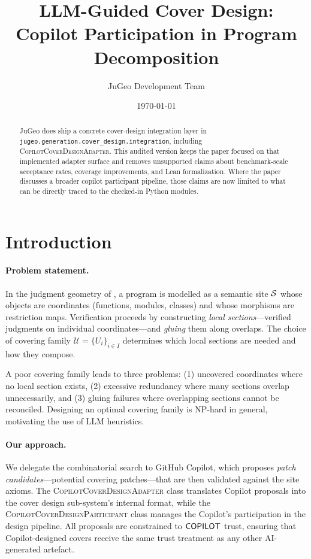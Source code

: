 \documentclass[11pt]{article}
\title{LLM-Guided Cover Design:\\
Copilot Participation in Program Decomposition}
\author{JuGeo Development Team}
\date{\today}
\newcommand{\CovAdapt}{\textsc{CopilotCoverDesignAdapter}}
\newcommand{\CovPart}{\textsc{CopilotCoverDesignParticipant}}
\newcommand{\covfam}{\mathcal{U}}
\begin{document}
\maketitle

\begin{abstract}
JuGeo does ship a concrete cover-design integration layer in
\texttt{jugeo.generation.cover\_design.integration}, including
\CovAdapt{}.  This audited version keeps the paper focused on that
implemented adapter surface and removes unsupported claims about
benchmark-scale acceptance rates, coverage improvements, and Lean
formalization.  Where the paper discusses a broader copilot participant
pipeline, those claims are now limited to what can be directly traced to
the checked-in Python modules.
\end{abstract}

\section{Introduction}\label{sec:intro}

\paragraph{Problem statement.}
In the judgment geometry of \JuGeo{}, a program is modelled as a semantic
site $\mathcal{S}$ whose objects are coordinates (functions, modules, classes) and
whose morphisms are restriction maps.  Verification proceeds by constructing
\emph{local sections}---verified judgments on individual coordinates---and
\emph{gluing} them along overlaps.  The choice of covering family
$\covfam = \{U_i\}_{i \in I}$ determines which local sections are needed
and how they compose.

A poor covering family leads to three problems: (1) uncovered coordinates
where no local section exists, (2) excessive redundancy where many sections
overlap unnecessarily, and (3) gluing failures where overlapping sections
cannot be reconciled.  Designing an optimal covering family is NP-hard in
general, motivating the use of LLM heuristics.

\paragraph{Our approach.}
We delegate the combinatorial search to GitHub Copilot, which proposes
\emph{patch candidates}---potential covering patches---that are then validated
against the site axioms.  The \CovAdapt{} class translates Copilot proposals
into the cover design sub-system's internal format, while the \CovPart{}
class manages the Copilot's participation in the design pipeline.  All
proposals are constrained to $\mathsf{COPILOT}$ trust, ensuring that Copilot-designed
covers receive the same trust treatment as any other AI-generated artefact.
\end{document}
